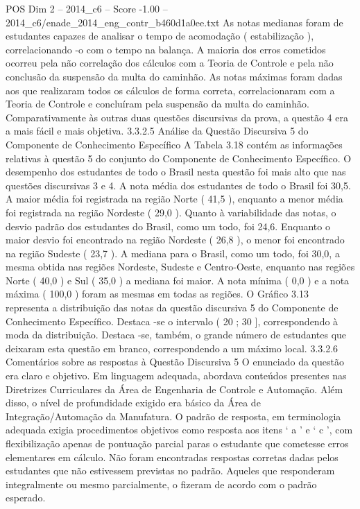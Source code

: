 \begin{textsample}{POS Dim 2 – 2014\_c6 – Score -1.00 – 2014\_c6/enade\_2014\_eng\_contr\_b460d1a0ee.txt}
As notas medianas foram de estudantes capazes de analisar o tempo de acomodação ( estabilização ), correlacionando -o com o tempo na balança.
A maioria dos erros cometidos ocorreu pela não correlação dos cálculos com a Teoria de Controle e pela não conclusão da suspensão da multa do caminhão.
As notas máximas foram dadas aos que realizaram todos os cálculos de forma correta, correlacionaram com a Teoria de Controle e concluíram pela suspensão da multa do caminhão.
Comparativamente às outras duas questões discursivas da prova, a questão 4 era a mais fácil e mais objetiva. 3.3.2.5 Análise da Questão Discursiva 5 do Componente de Conhecimento Específico A Tabela 3.18 contém as informações relativas à questão 5 do conjunto do Componente de Conhecimento Específico.
O desempenho dos estudantes de todo o Brasil nesta questão foi mais alto que nas questões discursivas 3 e 4.
A nota média dos estudantes de todo o Brasil foi 30,5.
A maior média foi registrada na região Norte ( 41,5 ), enquanto a menor média foi registrada na região Nordeste ( 29,0 ).
Quanto à variabilidade das notas, o desvio padrão dos estudantes do Brasil, como um todo, foi 24,6.
Enquanto o maior desvio foi encontrado na região Nordeste ( 26,8 ), o menor foi encontrado na região Sudeste ( 23,7 ).
A mediana para o Brasil, como um todo, foi 30,0, a mesma obtida nas regiões Nordeste, Sudeste e Centro-Oeste, enquanto nas regiões Norte ( 40,0 ) e Sul ( 35,0 ) a mediana foi maior.
A nota mínima ( 0,0 ) e a nota máxima ( 100,0 ) foram as mesmas em todas as regiões.
O Gráfico 3.13 representa a distribuição das notas da questão discursiva 5 do Componente de Conhecimento Específico.
Destaca -se o intervalo ( 20 ; 30 ], correspondendo à moda da distribuição.
Destaca -se, também, o grande número de estudantes que deixaram esta questão em branco, correspondendo a um máximo local. 3.3.2.6 Comentários sobre as respostas à Questão Discursiva 5 O enunciado da questão era claro e objetivo.
Em linguagem adequada, abordava conteúdos presentes nas Diretrizes Curriculares da Área de Engenharia de Controle e Automação.
Além disso, o nível de profundidade exigido era básico da Área de Integração/Automação da Manufatura.
O padrão de resposta, em terminologia adequada exigia procedimentos objetivos como resposta aos itens ‘ a ’ e ‘ c ’, com flexibilização apenas de pontuação parcial paras o estudante que cometesse erros elementares em cálculo.
Não foram encontradas respostas corretas dadas pelos estudantes que não estivessem previstas no padrão.
Aqueles que responderam integralmente ou mesmo parcialmente, o fizeram de acordo com o padrão esperado.

\end{textsample}
